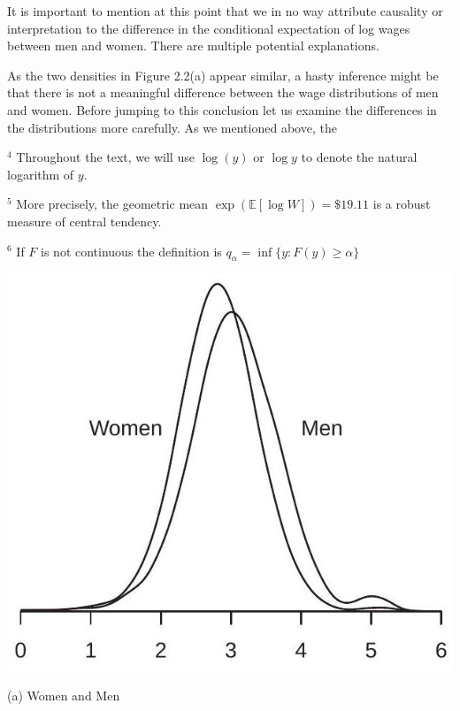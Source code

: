 \documentclass[10pt]{article}
\begin{document}
It is important to mention at this point that we in no way attribute causality or interpretation to the difference in the conditional expectation of log wages between men and women. There are multiple potential explanations.

As the two densities in Figure 2.2(a) appear similar, a hasty inference might be that there is not a meaningful difference between the wage distributions of men and women. Before jumping to this conclusion let us examine the differences in the distributions more carefully. As we mentioned above, the

${ }^{4}$ Throughout the text, we will use $\log (y)$ or $\log y$ to denote the natural logarithm of $y$.

${ }^{5}$ More precisely, the geometric mean $\exp (\mathbb{E}[\log W])=\$ 19.11$ is a robust measure of central tendency.

${ }^{6}$ If $F$ is not continuous the definition is $q_{\alpha}=\inf \{y: F(y) \geq \alpha\}$

\includegraphics[max width=\textwidth]{2022_09_17_efa0deee3441d06e0b66g-04}

(a) Women and Men
\end{document}
